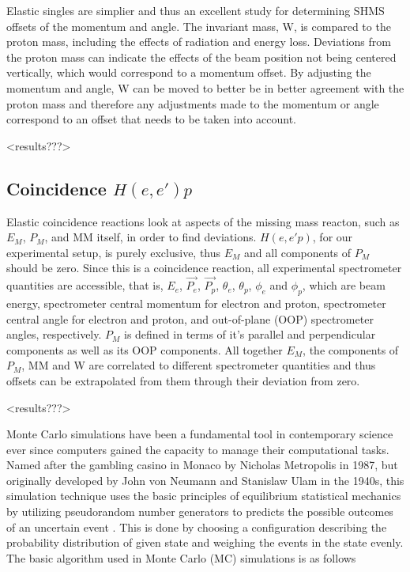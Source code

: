 \documentclass[
]{report}
\begin{document}
Elastic singles are simplier and thus an excellent study for determining
SHMS offsets of the momentum and angle. The invariant mass, W, is
compared to the proton mass, including the effects of radiation and
energy loss. Deviations from the proton mass can indicate the effects of
the beam position not being centered vertically, which would correspond
to a momentum offset. By adjusting the momentum and angle, W can be
moved to better be in better agreement with the proton mass and
therefore any adjustments made to the momentum or angle correspond to an
offset that needs to be taken into account.

\textless results???\textgreater{}

\hypertarget{coincidence-heep}{%
\subsection{\texorpdfstring{Coincidence
\(H(e,e')p\)}{Coincidence H(e,e\textquotesingle)p}}\label{coincidence-heep}}

Elastic coincidence reactions look at aspects of the missing mass
reacton, such as \(E_M\), \(P_M\), and MM itself, in order to find
deviations. \(H(e,e'p)\), for our experimental setup, is purely
exclusive, thus \(E_M\) and all components of \(P_M\) should be zero.
Since this is a coincidence reaction, all experimental spectrometer
quantities are accessible, that is, \(E_e\), \(\vec{P_e}\),
\(\vec{P_p}\), \(\theta_e\), \(\theta_p\), \(\phi_e\) and \(\phi_p\),
which are beam energy, spectrometer central momentum for electron and
proton, spectrometer central angle for electron and proton, and
out-of-plane (OOP) spectrometer angles, respectively. \(P_M\) is defined
in terms of it's parallel and perpendicular components as well as its
OOP components. All together \(E_M\), the components of \(P_M\), MM and
W are correlated to different spectrometer quantities and thus offsets
can be extrapolated from them through their deviation from zero.

\textless results???\textgreater{}

\label{Chapter-6}

Monte Carlo simulations have been a fundamental tool in contemporary
science ever since computers gained the capacity to manage their
computational tasks. Named after the gambling casino in Monaco by
Nicholas Metropolis in 1987, but originally developed by John von
Neumann and Stanislaw Ulam in the 1940s, this simulation technique uses
the basic principles of equilibrium statistical mechanics by utilizing
pseudorandom number generators to predicts the possible outcomes of an
uncertain event \cite{pathria_statistical_2011}. This is done by
choosing a configuration describing the probability distribution of
given state and weighing the events in the state evenly. The basic
algorithm used in Monte Carlo (MC) simulations is as follows
\end{document}
